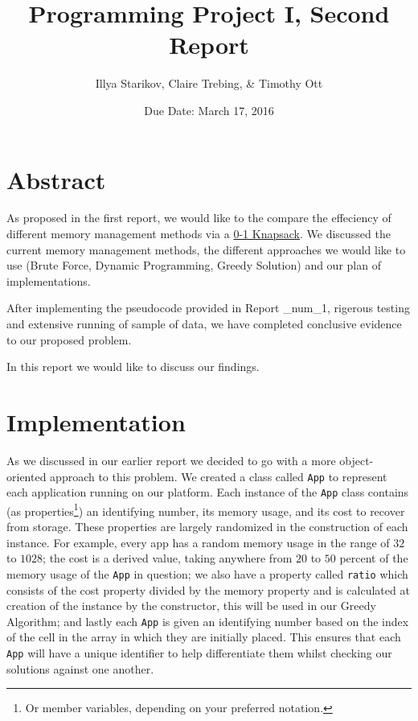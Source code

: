 \documentclass{article}
\title{Programming Project I, Second Report}
\author{Illya Starikov, Claire Trebing, \& Timothy Ott}
\date{Due Date: March 17, 2016}
\newcommand{\ignore}[1]{}
\begin{document}
\maketitle

\section{Abstract}
As proposed in the first report, we would like to the compare the effeciency of different memory management methods via a \href{https://en.wikipedia.org/wiki/Knapsack_problem_num_0.2F1_knapsack_problem}{0-1 Knapsack}. We discussed the current memory management methods, the different approaches we would like to use (Brute Force, Dynamic Programming, Greedy Solution) and our plan of implementations.

After implementing the pseudocode provided in Report \_num_1, rigerous testing and extensive running of sample of data, we have completed conclusive evidence to our proposed problem.

In this report we would like to discuss our findings.

\section{Implementation}
As we discussed in our earlier report we decided to go with a more object-oriented approach to this problem. We created a class called \texttt{App} to represent each application running on our platform. Each instance of the \texttt{App} class contains (as properties\footnote{Or member variables, depending on your preferred notation.}) an identifying number, its memory usage, and its cost to recover from storage. These properties are largely randomized in the construction of each instance. For example, every app has a random memory usage in the range of $32$ to $1028$; the cost is a derived value, taking anywhere from $20$ to $50$ percent of the memory usage of the \texttt{App} in question; we also have a property called \texttt{ratio} which consists of the cost property divided by the memory property and is calculated at creation of the instance by the constructor, this will be used in our Greedy Algorithm; and lastly each \texttt{App} is given an identifying number based on the index of the cell in the array in which they are initially placed. This ensures that each \texttt{App} will have a unique identifier to help differentiate them whilst\ignore{Sorry, couldn't resist swapping out while for whilst!} checking our solutions against one another.
\end{document}
